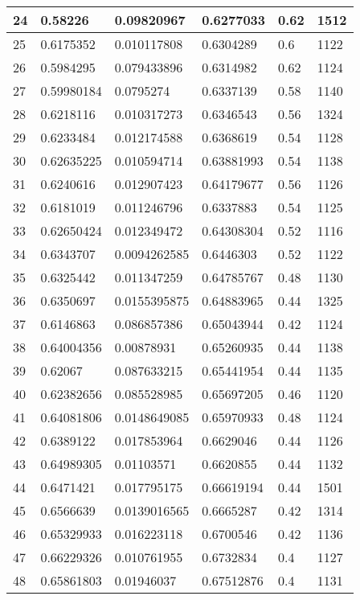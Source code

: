 \begin{longtable}{|l|l|l|l|l|l|}
24 & 0.58226 & 0.09820967 & 0.6277033 & 0.62 & 1512 \\ \hline 
25 & 0.6175352 & 0.010117808 & 0.6304289 & 0.6 & 1122 \\ \hline 
26 & 0.5984295 & 0.079433896 & 0.6314982 & 0.62 & 1124 \\ \hline 
27 & 0.59980184 & 0.0795274 & 0.6337139 & 0.58 & 1140 \\ \hline 
28 & 0.6218116 & 0.010317273 & 0.6346543 & 0.56 & 1324 \\ \hline 
29 & 0.6233484 & 0.012174588 & 0.6368619 & 0.54 & 1128 \\ \hline 
30 & 0.62635225 & 0.010594714 & 0.63881993 & 0.54 & 1138 \\ \hline 
31 & 0.6240616 & 0.012907423 & 0.64179677 & 0.56 & 1126 \\ \hline 
32 & 0.6181019 & 0.011246796 & 0.6337883 & 0.54 & 1125 \\ \hline 
33 & 0.62650424 & 0.012349472 & 0.64308304 & 0.52 & 1116 \\ \hline 
34 & 0.6343707 & 0.0094262585 & 0.6446303 & 0.52 & 1122 \\ \hline 
35 & 0.6325442 & 0.011347259 & 0.64785767 & 0.48 & 1130 \\ \hline 
36 & 0.6350697 & 0.0155395875 & 0.64883965 & 0.44 & 1325 \\ \hline 
37 & 0.6146863 & 0.086857386 & 0.65043944 & 0.42 & 1124 \\ \hline 
38 & 0.64004356 & 0.00878931 & 0.65260935 & 0.44 & 1138 \\ \hline 
39 & 0.62067 & 0.087633215 & 0.65441954 & 0.44 & 1135 \\ \hline 
40 & 0.62382656 & 0.085528985 & 0.65697205 & 0.46 & 1120 \\ \hline 
41 & 0.64081806 & 0.0148649085 & 0.65970933 & 0.48 & 1124 \\ \hline 
42 & 0.6389122 & 0.017853964 & 0.6629046 & 0.44 & 1126 \\ \hline 
43 & 0.64989305 & 0.01103571 & 0.6620855 & 0.44 & 1132 \\ \hline 
44 & 0.6471421 & 0.017795175 & 0.66619194 & 0.44 & 1501 \\ \hline 
45 & 0.6566639 & 0.0139016565 & 0.6665287 & 0.42 & 1314 \\ \hline 
46 & 0.65329933 & 0.016223118 & 0.6700546 & 0.42 & 1136 \\ \hline 
47 & 0.66229326 & 0.010761955 & 0.6732834 & 0.4 & 1127 \\ \hline 
48 & 0.65861803 & 0.01946037 & 0.67512876 & 0.4 & 1131 \\ \hline 

\end{longtable}
